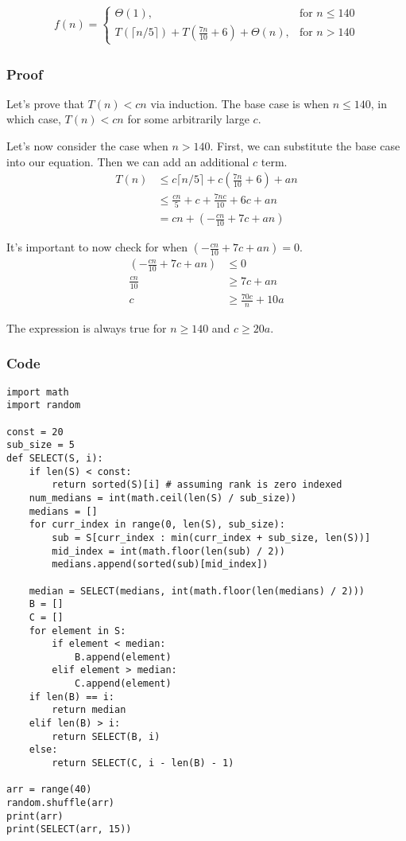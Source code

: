 \documentclass[12pt]{article}
\newcommand\ceil[1]{\lceil#1\rceil}
\begin{document}
\begin{align*}
f(n) = 
\begin{cases} 
	\Theta(1), & \mbox{for } n \leq 140 \\
	T(\ceil{n / 5}) + T(\frac{7n}{10} + 6) + \Theta(n), & \mbox{for } n > 140
\end{cases}
\end{align*}

\subsubsection*{Proof}
\par{Let's prove that $T(n) < cn$ via induction. The base case is when $n \leq 140$, in which case, $T(n) < cn$ for some arbitrarily large $c$.}
\par{Let's now consider the case when $n > 140$. First, we can substitute the base case into our equation. Then we can add an additional $c$ term.}
\begin{align*}
T(n) &\leq c\ceil{n / 5} + c(\frac{7n}{10} + 6) + an \\
&\leq \frac{cn}{5} + c + \frac{7nc}{10} + 6c + an \\
&= cn + (-\frac{cn}{10} + 7c + an)
\end{align*}
\par{It's important to now check for when $(-\frac{cn}{10} + 7c + an) = 0$.}
\begin{align*}
(-\frac{cn}{10} + 7c + an) &\leq 0 \\
\frac{cn}{10} &\geq 7c + an \\
c &\geq \frac{70c}{n} + 10a
\end{align*}
\par{The expression is always true for $n \geq 140$ and $c \geq 20a$.}

\subsubsection*{Code}
\begin{lstlisting}
import math
import random

const = 20
sub_size = 5
def SELECT(S, i):
	if len(S) < const:
		return sorted(S)[i] # assuming rank is zero indexed
	num_medians = int(math.ceil(len(S) / sub_size))
	medians = []
	for curr_index in range(0, len(S), sub_size):
		sub = S[curr_index : min(curr_index + sub_size, len(S))]
		mid_index = int(math.floor(len(sub) / 2))
		medians.append(sorted(sub)[mid_index])

	median = SELECT(medians, int(math.floor(len(medians) / 2)))
	B = []
	C = []
	for element in S:
		if element < median:
			B.append(element)
		elif element > median:
			C.append(element)
	if len(B) == i:
		return median
	elif len(B) > i:
		return SELECT(B, i)
	else:
		return SELECT(C, i - len(B) - 1)

arr = range(40)
random.shuffle(arr)
print(arr)
print(SELECT(arr, 15))
\end{lstlisting}
\end{document}

